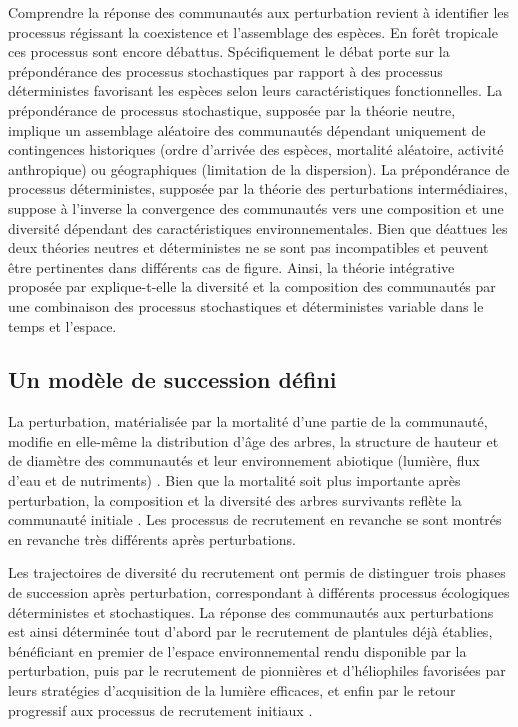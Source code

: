 \documentclass[
  11pt,
  french,
  A4paper,
  extrafontsizes,onecolumn,openright
  ]{memoir}
\begin{document}
Comprendre la réponse des communautés aux perturbation revient à
identifier les processus régissant la coexistence et l'assemblage des
espèces. En forêt tropicale ces processus sont encore débattus.
Spécifiquement le débat porte sur la prépondérance des processus
stochastiques par rapport à des processus déterministes favorisant les
espèces selon leurs caractéristiques fonctionnelles. La prépondérance de
processus stochastique, supposée par la théorie neutre, implique un
assemblage aléatoire des communautés dépendant uniquement de
contingences historiques (ordre d'arrivée des espèces, mortalité
aléatoire, activité anthropique) ou géographiques (limitation de la
dispersion). La prépondérance de processus déterministes, supposée par
la théorie des perturbations intermédiaires, suppose à l'inverse la
convergence des communautés vers une composition et une diversité
dépendant des caractéristiques environnementales. Bien que déattues les
deux théories neutres et déterministes ne se sont pas incompatibles et
peuvent être pertinentes dans différents cas de figure. Ainsi, la
théorie intégrative proposée par \textcite{Chave2004} explique-t-elle la
diversité et la composition des communautés par une combinaison des
processus stochastiques et déterministes variable dans le temps et
l'espace.

\subsection{Un modèle de succession
défini}\label{un-modele-de-succession-defini}

La perturbation, matérialisée par la mortalité d'une partie de la
communauté, modifie en elle-même la distribution d'âge des arbres, la
structure de hauteur et de diamètre des communautés et leur
environnement abiotique (lumière, flux d'eau et de nutriments)
\autocites{Gourlet-Fleury2000}{Putz2012}{Piponiot2016}{Rutishauser2016}.
Bien que la mortalité soit plus importante après perturbation, la
composition et la diversité des arbres survivants reflète la communauté
initiale \autocite{Herault2018}. Les processus de recrutement en
revanche se sont montrés en revanche très différents après
perturbations.

Les trajectoires de diversité du recrutement ont permis de distinguer
trois phases de succession après perturbation, correspondant à
différents processus écologiques déterministes et stochastiques. La
réponse des communautés aux perturbations est ainsi déterminée tout
d'abord par le recrutement de plantules déjà établies, bénéficiant en
premier de l'espace environnemental rendu disponible par la
perturbation, puis par le recrutement de pionnières et d'héliophiles
favorisées par leurs stratégies d'acquisition de la lumière efficaces,
et enfin par le retour progressif aux processus de recrutement initiaux
\autocites{Denslow2000}{Herault2010}{Herault2011}.
\end{document}
